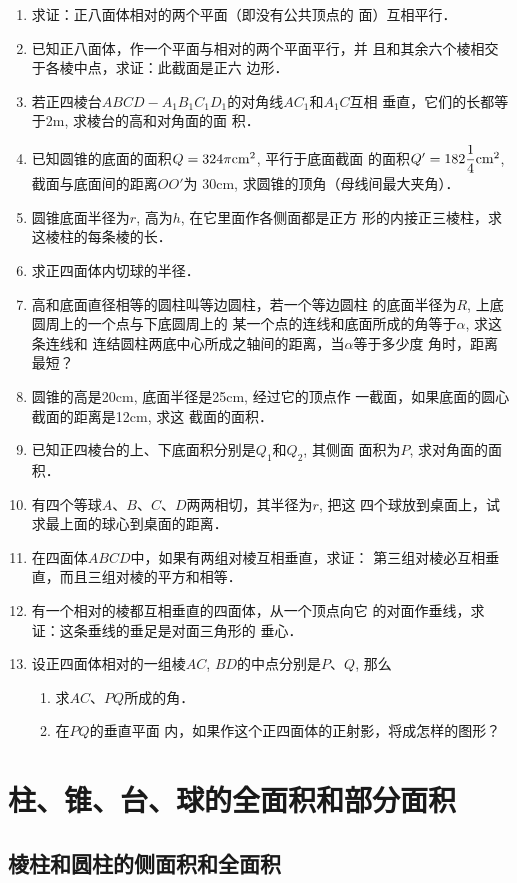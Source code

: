 \begin{enumerate}
\item 求证：正八面体相对的两个平面（即没有公共顶点的
面）互相平行．
\item 已知正八面体，作一个平面与相对的两个平面平行，并
且和其余六个棱相交于各棱中点，求证：此截面是正六
边形．
\item 若正四棱台$ABCD-A_1B_1C_1D_1$的对角线$AC_1$和$A_1C$互相
垂直，它们的长都等于2m, 求棱台的高和对角面的面
积．
\item 已知圆锥的底面的面积$Q=324\pi{\rm cm^2}$, 平行于底面截面
的面积$Q'=182\frac{1}{4}{\rm cm^2}$, 截面与底面间的距离$OO'$为
30cm, 求圆锥的顶角（母线间最大夹角）．
\item 圆锥底面半径为$r$, 高为$h$, 在它里面作各侧面都是正方
形的内接正三棱柱，求这棱柱的每条棱的长．
\item 求正四面体内切球的半径．
\item 高和底面直径相等的圆柱叫等边圆柱，若一个等边圆柱
的底面半径为$R$, 上底圆周上的一个点与下底圆周上的
某一个点的连线和底面所成的角等于$\alpha$, 求这条连线和
连结圆柱两底中心所成之轴间的距离，当$\alpha$等于多少度
角时，距离最短？
\item 圆锥的高是20cm, 底面半径是25cm, 经过它的顶点作
一截面，如果底面的圆心截面的距离是12cm, 求这
截面的面积．
\item 已知正四棱台的上、下底面积分别是$Q_1$和$Q_2$, 其侧面
面积为$P$, 求对角面的面积．
\item 有四个等球$A$、$B$、$C$、$D$两两相切，其半径为$r$, 把这
四个球放到桌面上，试求最上面的球心到桌面的距离．
\item 在四面体$ABCD$中，如果有两组对棱互相垂直，求证：
第三组对棱必互相垂直，而且三组对棱的平方和相等．
\item 有一个相对的棱都互相垂直的四面体，从一个顶点向它
的对面作垂线，求证：这条垂线的垂足是对面三角形的
垂心．
\item 设正四面体相对的一组棱$AC$, $BD$的中点分别是$P$、$Q$,
那么
\begin{enumerate}
\item 求$AC$、$PQ$所成的角．    
\item 在$PQ$的垂直平面
内，如果作这个正四面体的正射影，将成怎样的图形？
\end{enumerate}
\end{enumerate}

\section{柱、锥、台、球的全面积和部分面积}

\subsection{棱柱和圆柱的侧面积和全面积}

